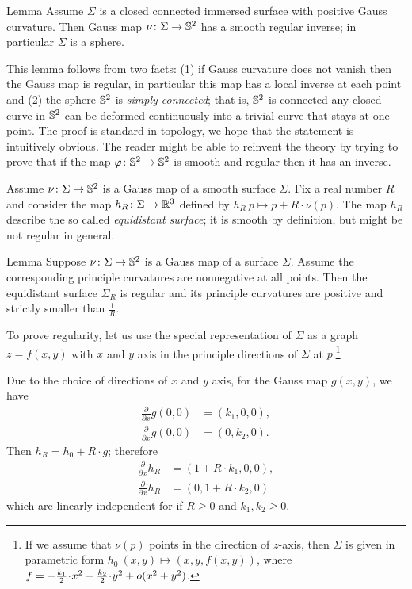 \begin{thm}{Lemma}\label{lem:gauss-inverse}
Assume $\Sigma$ is a closed connected immersed surface with positive Gauss curvature.
Then Gauss map $\nu\colon\Sigma \to \mathbb{S}^2$ has a smooth regular inverse;
in particular $\Sigma$ is a sphere.
\end{thm}

This lemma follows from two facts:
(1) if Gauss curvature does not vanish then the  Gauss map is regular, in particular this map has a local inverse at each point
and
(2) the sphere $\mathbb{S}^2$ is \emph{simply connected};
that is, $\mathbb{S}^2$ is connected any closed curve in $\mathbb{S}^2$ can be deformed continuously into a trivial curve that stays at one point.
The proof is standard in topology, we hope that the statement is intuitively obvious.
The reader might be able to reinvent the theory by trying to prove that if the map $\varphi\colon\mathbb{S}^2\to\mathbb{S}^2$ is smooth and regular then it has an inverse.

Assume $\nu\colon\Sigma\to \mathbb{S}^2$ is a Gauss map of a smooth surface $\Sigma$.
Fix a real number $R$ and consider the map $h_R\:\Sigma\z\to\RR^3$ defined by $h_R\:p\mapsto p+R\cdot\nu(p)$.
The map $h_R$ describe the so called \emph{equidistant surface};
it is smooth by definition, but might be not regular in general.

\begin{thm}{Lemma}\label{lem:curc<1/R}
Suppose $\nu\colon\Sigma\to \mathbb{S}^2$ is a Gauss map of a surface $\Sigma$.
Assume the corresponding principle curvatures are nonnegative at all points. 
Then the equidistant surface $\Sigma_R$ is regular and its principle curvatures are positive and strictly smaller than $\tfrac1R$.
\end{thm}

To prove regularity, let us use the special representation of $\Sigma$ as a graph $z=f(x,y)$ with $x$ and $y$ axis in the principle directions of $\Sigma$ at $p$.\footnote{If we assume that $\nu(p)$ points in the direction of $z$-axis, then $\Sigma$ is given in parametric form 
$h_0\:(x,y)\mapsto (x,y,f(x,y))$,
where $f\z=-\tfrac{k_1}2\cdot x^2-\tfrac{k_2}2\cdot y^2+o(x^2+y^2)$.}

Due to the choice of directions of $x$ and $y$ axis,
for the Gauss map $g(x,y)$, we have 
\begin{align*}
\tfrac{\partial}{\partial x}g(0,0)&=(k_1,0,0),
\\
\tfrac{\partial}{\partial x}g(0,0)&=(0,k_2,0).
\end{align*}
Then $h_R=h_0+R\cdot g$; therefore
\begin{align*}
\tfrac{\partial}{\partial x} h_R&=(1+R\cdot k_1,0,0),
\\
\tfrac{\partial}{\partial x} h_R&=(0,1+R\cdot k_2,0)
\end{align*}
which are linearly independent for if $R\ge0$ and $k_1,k_2\ge 0$. 


